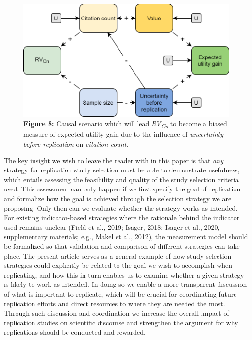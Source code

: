 \documentclass[
  english,
  jou,floatsintext]{apa6}
\begin{document}
\begin{figure}
\centering
\includegraphics{figure_8.png}
\caption{\textbf{Figure 8:} Causal scenario which will lead \emph{RV\textsubscript{Cn}} to become a biased measure of expected utility gain due to the influence of \emph{uncertainty before replication} on \emph{citation count}. \label{fig:8}}
\end{figure}

The key insight we wish to leave the reader with in this paper is that \emph{any} strategy for replication study selection must be able to demonstrate usefulness, which entails assessing the feasibility and quality of the study selection criteria used. This assessment can only happen if we first specify the goal of replication and formalize how the goal is achieved through the selection strategy we are proposing. Only then can we evaluate whether the strategy works as intended. For existing indicator-based strategies where the rationale behind the indicator used remains unclear (Field et al., 2019; Isager, 2018; Isager et al., 2020, supplementary materials; e.g., Makel et al., 2012), the measurement model should be formalized so that validation and comparison of different strategies can take place. The present article serves as a general example of how study selection strategies could explicitly be related to the goal we wish to accomplish when replicating, and how this in turn enables us to examine whether a given strategy is likely to work as intended. In doing so we enable a more transparent discussion of what is important to replicate, which will be crucial for coordinating future replication efforts and direct resources to where they are needed the most. Through such discussion and coordination we increase the overall impact of replication studies on scientific discourse and strengthen the argument for why replications should be conducted and rewarded.
\end{document}
